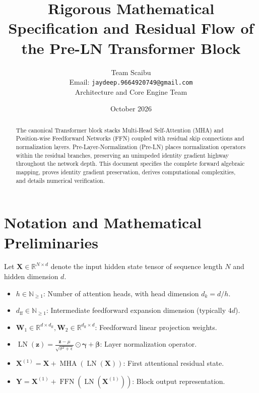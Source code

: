 \documentclass[11pt,a4paper]{article}
\title{\textbf{Rigorous Mathematical Specification and Residual Flow of the Pre-LN Transformer Block}}
\author{Team Scaibu \\ \small Email: \texttt{jaydeep.9664920749@gmail.com} \\ \small Architecture and Core Engine Team}
\date{October 2026}
\theoremstyle{definition}
\begin{document}
\maketitle

\begin{abstract}
The canonical Transformer block stacks Multi-Head Self-Attention (MHA) and Position-wise Feedforward Networks (FFN) coupled with residual skip connections and normalization layers. Pre-Layer-Normalization (Pre-LN) places normalization operators within the residual branches, preserving an unimpeded identity gradient highway throughout the network depth. This document specifies the complete forward algebraic mapping, proves identity gradient preservation, derives computational complexities, and details numerical verification.
\end{abstract}

\section{Notation and Mathematical Preliminaries}

Let $\mathbf{X} \in \mathbb{R}^{N \times d}$ denote the input hidden state tensor of sequence length $N$ and hidden dimension $d$.

\begin{itemize}
    \item $h \in \mathbb{N}_{\ge 1}$: Number of attention heads, with head dimension $d_k = d / h$.
    \item $d_{\text{ff}} \in \mathbb{N}_{\ge 1}$: Intermediate feedforward expansion dimension (typically $4d$).
    \item $\mathbf{W}_1 \in \mathbb{R}^{d \times d_{\text{ff}}}, \mathbf{W}_2 \in \mathbb{R}^{d_{\text{ff}} \times d}$: Feedforward linear projection weights.
    \item $\operatorname{LN}(\mathbf{z}) = \frac{\mathbf{z} - \mu}{\sqrt{\sigma^2 + \epsilon}} \odot \boldsymbol{\gamma} + \boldsymbol{\beta}$: Layer normalization operator.
    \item $\mathbf{X}^{(1)} = \mathbf{X} + \operatorname{MHA}(\operatorname{LN}(\mathbf{X}))$: First attentional residual state.
    \item $\mathbf{Y} = \mathbf{X}^{(1)} + \operatorname{FFN}(\operatorname{LN}(\mathbf{X}^{(1)}))$: Block output representation.
\end{itemize}
\end{document}
